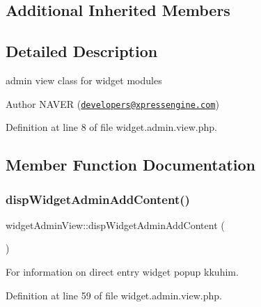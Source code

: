 \subsection*{Additional Inherited Members}


\subsection{Detailed Description}
admin view class for widget modules 

\begin{DoxyAuthor}{Author}
N\+A\+V\+ER (\href{mailto:developers@xpressengine.com}{\tt developers@xpressengine.\+com}) 
\end{DoxyAuthor}


Definition at line 8 of file widget.\+admin.\+view.\+php.



\subsection{Member Function Documentation}
\hypertarget{classwidgetAdminView_a2f499c5195c994d427e80b9e3cbaa7ef}{}\label{classwidgetAdminView_a2f499c5195c994d427e80b9e3cbaa7ef} 
\subsubsection{\texorpdfstring{disp\+Widget\+Admin\+Add\+Content()}{dispWidgetAdminAddContent()}}
{\footnotesize\ttfamily widget\+Admin\+View\+::disp\+Widget\+Admin\+Add\+Content (\begin{DoxyParamCaption}{ }\end{DoxyParamCaption})}



For information on direct entry widget popup kkuhim. 



Definition at line 59 of file widget.\+admin.\+view.\+php.

\hypertarget{classwidgetAdminView_ad5defcecf21fb470cb6c3b2e868941a0}{}\label{classwidgetAdminView_ad5defcecf21fb470cb6c3b2e868941a0} 
